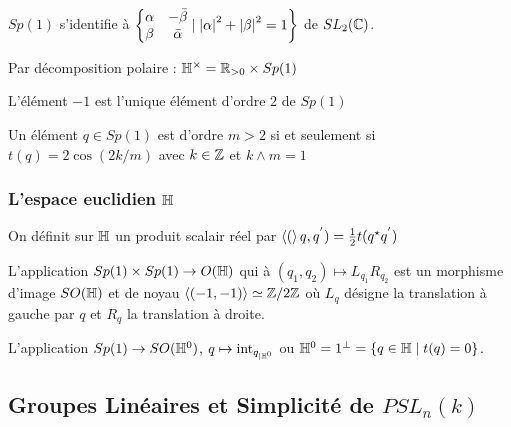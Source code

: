 \documentclass{cours}
\begin{document}
\begin{remark}
    $Sp(1)$ s'identifie à $\left\{\begin{matrix}\alpha & -\bar{\beta} \\ \beta & \bar{\alpha}\end{matrix}\mid \left|\alpha\right|^{2} + \left|\beta\right|^{2} = 1\right\}$ de $SL_{2}(\mathbb{C})$.
\end{remark}

\begin{proposition}
    Par décomposition polaire : $\mathbb{H}^{\times} = \mathbb{R}_{> 0} \times Sp(1)$
\end{proposition}

\begin{proposition}
    L'élément $-1$ est l'unique élément d'ordre $2$ de $Sp(1)$
\end{proposition}

\begin{proposition}
    Un élément $q \in Sp(1)$ est d'ordre $m > 2$ si et seulement si $t(q) = 2 \cos(2k / m)$ avec $k \in \mathbb{Z}$ et $k \wedge m = 1$
\end{proposition}

\subsubsection{L'espace euclidien $\mathbb{H}$}
\begin{definition}
    On définit sur $\mathbb{H}$ un produit scalair réel par $\left\langle ( \right\rangle q, q^{'}) = \frac{1}{2}t(q^{\star}q^{'})$
\end{definition}

\begin{proposition}
    L'application $Sp(1) \times Sp(1) \to O(\mathbb{H})$ qui à $\left(q_{1}, q_{2}\right) \mapsto L_{q_{1}}R_{q_{2}}$ est un morphisme d'image $SO(\mathbb{H})$ et de noyau $\left\langle (-1, -1) \right\rangle \simeq \mathbb{Z}/2\mathbb{Z}$ où $L_{q}$ désigne la translation à gauche par $q$ et $R_{q}$ la translation à droite. 
\end{proposition}

\begin{proposition}
    L'application $Sp(1) \rightarrow SO(\mathbb{H}^{0})$, $q\mapsto \text{int}_{q_{\mid\mathbb{H}^{0}}}$ ou $\mathbb{H}^{0} = 1^{\perp} = \left\{q \in \mathbb{H} \mid t(q) = 0\right\}$.
\end{proposition}

\subsection{Groupes Linéaires et Simplicité de $PSL_{n}(k)$}
\end{document}
